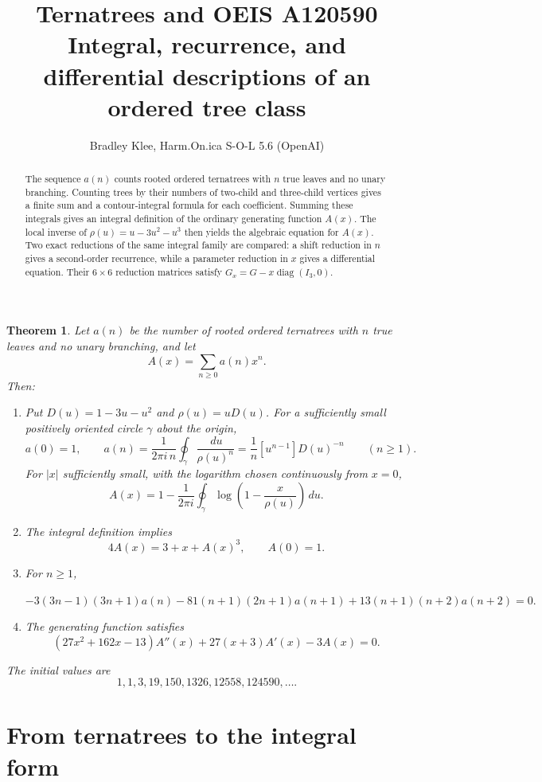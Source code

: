 \documentclass[11pt,fleqn]{article}
\title{\vspace{-2.1em}\textbf{Ternatrees and OEIS A120590}\\[0.3em]
\large Integral, recurrence, and differential descriptions of an ordered tree class}
\author{Bradley Klee, \quad Harm.On.ica S-O-L 5.6 \textnormal{(OpenAI)}}
\date{}
\theoremstyle{plain}
\newtheorem*{theorem}{Theorem}
\newcommand{\dd}{\,d}
\begin{document}
\maketitle
\thispagestyle{empty}

\begin{abstract}
The sequence $a(n)$ counts rooted ordered ternatrees with $n$ true leaves and
no unary branching.  Counting trees by their numbers of two-child and
three-child vertices gives a finite sum and a contour-integral formula for
each coefficient.  Summing these integrals gives an integral definition of
the ordinary generating function $A(x)$.  The local inverse of
$\rho(u)=u-3u^2-u^3$ then yields the algebraic equation for $A(x)$.  Two exact
reductions of the same integral family are compared: a shift reduction in $n$
gives a second-order recurrence, while a parameter reduction in $x$ gives a
differential equation.  Their $6\times6$ reduction matrices satisfy
$G_x=G-x\operatorname{diag}(I_3,0)$.
\end{abstract}

\begin{theorem}
Let $a(n)$ be the number of rooted ordered ternatrees with $n$ true leaves and
no unary branching, and let
\[
A(x)=\sum_{n\ge0}a(n)x^n.
\]
Then:
\begin{enumerate}[label=(\arabic*),leftmargin=2.2em,itemsep=0.55em,topsep=0.35em]
\item Put $D(u)=1-3u-u^2$ and $\rho(u)=uD(u)$.  For a sufficiently small
positively oriented circle $\gamma$ about the origin,
\[
a(0)=1,\qquad
 a(n)=\frac{1}{2\pi i\,n}\oint_\gamma\frac{\dd u}{\rho(u)^n}
     =\frac1n[u^{n-1}]D(u)^{-n}\qquad(n\ge1).
\]
For $|x|$ sufficiently small, with the logarithm chosen continuously from
$x=0$,
\[
A(x)=1-\frac{1}{2\pi i}\oint_\gamma
\log\!\left(1-\frac{x}{\rho(u)}\right)\dd u.
\]
\item The integral definition implies
\[
4A(x)=3+x+A(x)^3,\qquad A(0)=1.
\]
\item For $n\ge1$,
\begin{center}
\small
$-3(3n-1)(3n+1)a(n)-81(n+1)(2n+1)a(n+1)+13(n+1)(n+2)a(n+2)=0.$
\end{center}
\item The generating function satisfies
\[
(27x^2+162x-13)A''(x)+27(x+3)A'(x)-3A(x)=0.
\]
\end{enumerate}
The initial values are
\[
1,1,3,19,150,1326,12558,124590,\ldots.
\]
\end{theorem}

\clearpage
\section{From ternatrees to the integral form}
\end{document}
